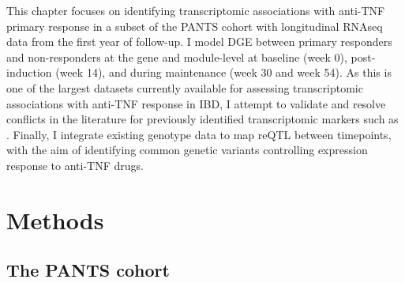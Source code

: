 This chapter focuses on identifying transcriptomic associations with anti-\gls{TNF} primary response 
in a subset of the \gls{PANTS} cohort with longitudinal \gls{RNAseq} data from the first year of follow-up.
I model \gls{DGE} between primary responders and non-responders at the gene and module-level 
at baseline (week 0), post-induction (week 14), and during maintenance (week 30 and week 54).
As this is one of the largest datasets currently available for assessing transcriptomic associations with anti-\gls{TNF} response in \gls{IBD},
I attempt to validate and resolve conflicts in the literature for previously identified transcriptomic markers such as .
Finally, I integrate existing genotype data to map \gls{reQTL} between timepoints,
with the aim of identifying common genetic variants controlling expression response to anti-\gls{TNF} drugs.


\section{Methods}

\subsection{The PANTS cohort}

